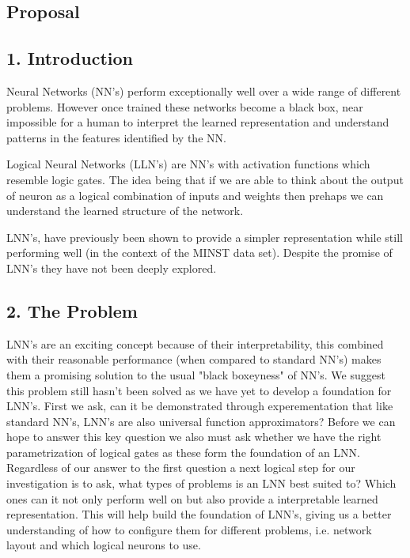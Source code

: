 \begin{appendices}
\chapter{Proposal}
\section*{1. Introduction}

Neural Networks (NN's) perform exceptionally well over a wide range of different problems. However once trained these networks become a black box, near impossible for a human to interpret the learned representation and understand patterns in the features identified by the NN. 

Logical Neural Networks (LLN's) are NN's with activation functions which resemble logic gates. The idea being that if we are able to think about the output of neuron as a logical combination of inputs and weights then prehaps we can understand the learned structure of the network.

LNN's, have previously been shown to provide a simpler representation while still performing well \cite{LearningLogicalActivations} (in the context of the MINST data set). Despite the promise of LNN's they have not been deeply explored.

\section*{2. The Problem}

LNN's are an exciting concept because of their interpretability, this combined with their reasonable performance (when compared to standard NN's) makes them a promising solution to the usual "black boxeyness" of NN's. We suggest this problem still hasn't been solved as we have yet to develop a foundation for LNN's. First we ask, can it be demonstrated through experementation that like standard NN's, LNN's are also universal function approximators?  Before we can hope to answer this key question we also must ask whether we have the right parametrization of logical gates as these form the foundation of an LNN. \\

Regardless of our answer to the first question a next logical step for our investigation is to ask, what types of problems is an LNN best suited to? Which ones can it not only perform well on but also provide a interpretable learned representation. This will help build the foundation of LNN's, giving us a better understanding of how to configure them for different problems, i.e. network layout and which logical neurons to use.\\


\end{appendices}
